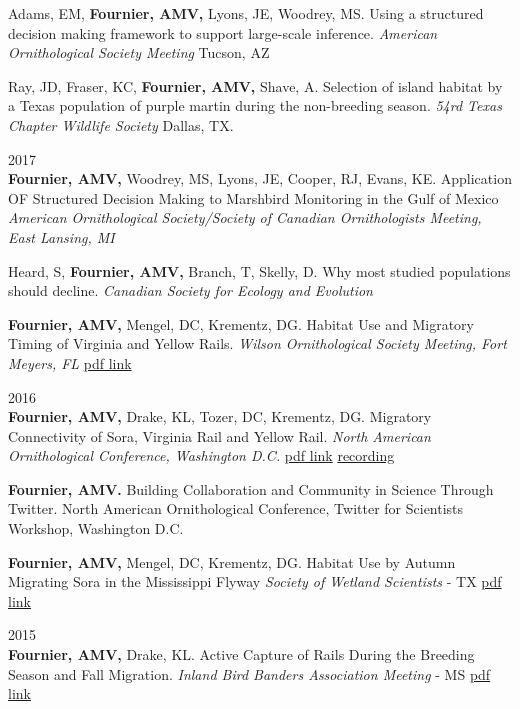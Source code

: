 \documentclass[]{article}
\begin{document}
Adams, EM, \textbf{Fournier, AMV,} Lyons, JE, Woodrey, MS. Using a
structured decision making framework to support large-scale inference.
\emph{American Ornithological Society Meeting} Tucson, AZ

Ray, JD, Fraser, KC, \textbf{Fournier, AMV,} Shave, A. Selection of
island habitat by a Texas population of purple martin during the
non-breeding season. \emph{54rd Texas Chapter Wildlife Society} Dallas,
TX.

2017\\
\textbf{Fournier, AMV,} Woodrey, MS, Lyons, JE, Cooper, RJ, Evans, KE.
Application OF Structured Decision Making to Marshbird Monitoring in the
Gulf of Mexico \emph{American Ornithological Society/Society of Canadian
Ornithologists Meeting, East Lansing, MI}

Heard, S, \textbf{Fournier, AMV,} Branch, T, Skelly, D. Why most studied
populations should decline. \emph{Canadian Society for Ecology and
Evolution}

\textbf{Fournier, AMV,} Mengel, DC, Krementz, DG. Habitat Use and
Migratory Timing of Virginia and Yellow Rails. \emph{Wilson
Ornithological Society Meeting, Fort Meyers, FL}
\href{https://figshare.com/articles/Virginia_and_Yellow_Rail_Autumn_Migration_Phenology_and_Habitat_Use/4724296}{pdf
link}

2016\\
\textbf{Fournier, AMV,} Drake, KL, Tozer, DC, Krementz, DG. Migratory
Connectivity of Sora, Virginia Rail and Yellow Rail. \emph{North
American Ornithological Conference, Washington D.C.}
\href{https://figshare.com/articles/Migratory_Connectivity_of_Sora_Virginia_and_Yellow_Rails/3565578}{pdf
link} \href{https://www.periscope.tv/w/1rmGPDyEAnyGN}{recording}

\textbf{Fournier, AMV.} Building Collaboration and Community in Science
Through Twitter. North American Ornithological Conference, Twitter for
Scientists Workshop, Washington D.C.

\textbf{Fournier, AMV,} Mengel, DC, Krementz, DG. Habitat Use by Autumn
Migrating Sora in the Mississippi Flyway \emph{Society of Wetland
Scientists} - TX
\href{https://figshare.com/articles/Habitat_Use_of_Autumn_Migrating_Sora_in_the_Mississippi_Flyway/3398683}{pdf
link}

2015\\
\textbf{Fournier, AMV,} Drake, KL. Active Capture of Rails During the
Breeding Season and Fall Migration. \emph{Inland Bird Banders
Association Meeting} - MS
\href{http://figshare.com/articles/Active_Capture_Methods_for_Rails_During_the_Breeding_Season_and_Fall_MIgration/1598135}{pdf
link}
\end{document}
